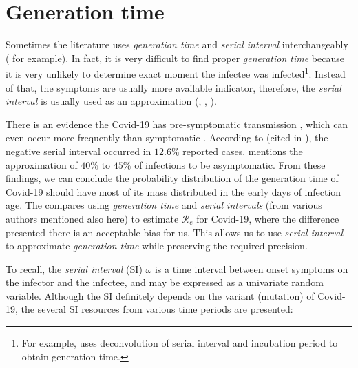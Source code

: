 \documentclass[
  digital, %
  oneside, %
  lof,     %
  lot,     %
]{fithesis4}
\begin{document}
\section{Generation time}

Sometimes the literature uses \textit{generation time} and \textit{serial interval} interchangeably (\cite{wallinga2004} for example).
In fact, it is very difficult to find
proper \textit{generation time} because it is very unlikely to determine
exact moment the infectee was infected\footnote{For example, \cite{knight2020} 
uses deconvolution of serial interval and incubation period to obtain generation time.}.
Instead of that, the symptoms
are usually more available indicator, therefore, the
\textit{serial interval} is usually used as an approximation (\cite{griffin2010}, \cite{najafi2020}, \cite{cori2013}).

There is an evidence the Covid-19 has pre-symptomatic 
transmission \cite{ma2020}, which can even occur more frequently 
than symptomatic \cite{nishiura2020}.
According to \cite{du2020} (cited in \cite{knight2020}), the negative serial interval 
occurred in $12.6\%$ reported cases.
\cite{oran2020} mentions the approximation of $40\%$ to $45\%$ of 
infections to be asymptomatic.
From these findings, we can conclude the probability distribution of the
generation time of Covid-19 should have most of its mass distributed in the early
days of infection age.
The \cite{knight2020} compares using \textit{generation time} and 
\textit{serial intervals} (from various authors mentioned also here) 
to estimate $\mathcal{R}_e$ for Covid-19, where the difference
presented there is an acceptable bias for us.
This allows us to use \textit{serial interval} to approximate
\textit{generation time} while preserving the required precision.

To recall, the \textit{serial interval} (SI) $\omega$ is a time 
interval between onset symptoms on the infector and the 
infectee, and may be expressed as a univariate random variable. 
Although the SI definitely depends on the variant (mutation) of 
Covid-19, the several SI resources from various time periods are 
presented:
\end{document}
